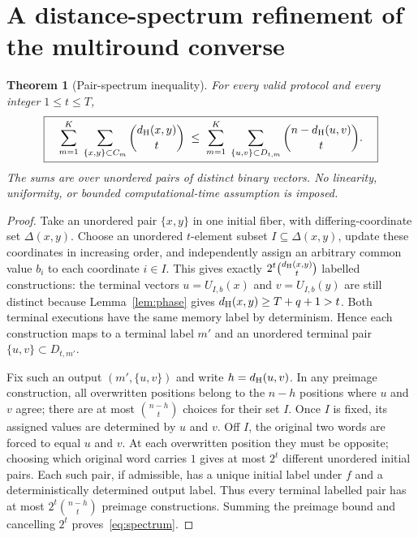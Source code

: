 \documentclass[11pt,a4paper]{article}
\newtheorem{theorem}{Theorem}[section]
\newcommand{\dist}{d_{\rm H}}
\begin{document}
\section{A distance-spectrum refinement of the multiround converse}\label{sec:spectrum}
\begin{theorem}[Pair-spectrum inequality]\label{thm:spectrum}
For every valid protocol and every integer $1\le t\le T$,
\begin{equation}\label{eq:spectrum}
\boxed{\quad
\sum_{m=1}^K\;\sum_{\{x,y\}\subset C_m}\binom{\dist(x,y)}{t}
\;\le\;
\sum_{m=1}^K\;\sum_{\{u,v\}\subset D_{t,m}}\binom{n-\dist(u,v)}{t}.
\quad}
\end{equation}
The sums are over unordered pairs of distinct binary vectors. No linearity, uniformity, or bounded computational-time assumption is imposed.
\end{theorem}
\begin{proof}
Take an unordered pair $\{x,y\}$ in one initial fiber, with differing-coordinate set $\Delta(x,y)$. Choose an unordered $t$-element subset $I\subseteq\Delta(x,y)$, update these coordinates in increasing order, and independently assign an arbitrary common value $b_i$ to each coordinate $i\in I$. This gives exactly $2^t\binom{\dist(x,y)}t$ labelled constructions: the terminal vectors $u=U_{I,b}(x)$ and $v=U_{I,b}(y)$ are still distinct because Lemma~\ref{lem:phase} gives $\dist(x,y)\ge T+q+1>t$. Both terminal executions have the same memory label by determinism. Hence each construction maps to a terminal label $m'$ and an unordered terminal pair $\{u,v\}\subset D_{t,m'}$.

Fix such an output $(m',\{u,v\})$ and write $h=\dist(u,v)$. In any preimage construction, all overwritten positions belong to the $n-h$ positions where $u$ and $v$ agree; there are at most $\binom{n-h}{t}$ choices for their set $I$. Once $I$ is fixed, its assigned values are determined by $u$ and $v$. Off $I$, the original two words are forced to equal $u$ and $v$. At each overwritten position they must be opposite; choosing which original word carries $1$ gives at most $2^t$ different unordered initial pairs. Each such pair, if admissible, has a unique initial label under $f$ and a deterministically determined output label. Thus every terminal labelled pair has at most $2^t\binom{n-h}{t}$ preimage constructions. Summing the preimage bound and cancelling $2^t$ proves~\eqref{eq:spectrum}.
\end{proof}
\end{document}
